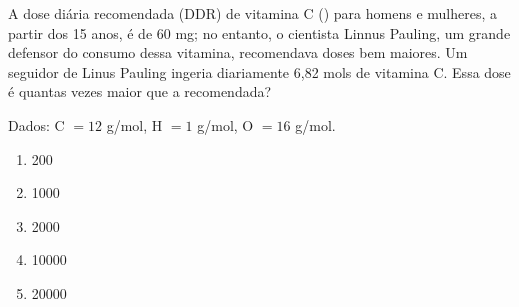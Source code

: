 A dose diária recomendada (DDR) de vitamina C () para homens e mulheres, a partir dos 15 anos, é de 60 mg;
no entanto, o cientista Linnus Pauling, um grande defensor do consumo dessa vitamina, recomendava doses bem maiores.
Um seguidor de Linus Pauling ingeria diariamente 6,82 mols de vitamina C.
Essa dose é quantas vezes maior que a recomendada?

Dados: C $= 12$ g/mol, H $= 1$ g/mol, O $= 16$ g/mol.

\begin{enumerate}[label = (\alph*), itemjoin={\quad}]
	\item 200
	\item 1000
	\item 2000
	\item 10000
	\item 20000
\end{enumerate}
